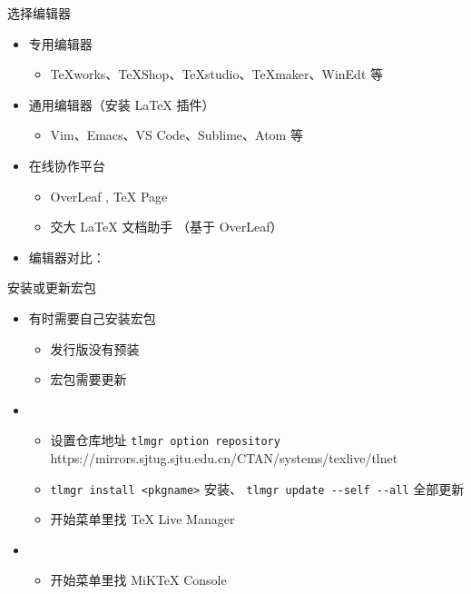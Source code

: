 \begin{frame}{选择编辑器}
  \begin{itemize}
    \item 专用编辑器
          \begin{itemize}
            \item TeXworks、TeXShop、\alert{TeXstudio}、TeXmaker、WinEdt 等
          \end{itemize}
    \item 通用编辑器（安装 \LaTeX{} 插件）
          \begin{itemize}
            \item Vim、Emacs、\alert{VS Code}、Sublime、Atom 等
          \end{itemize}
    \item 在线协作平台
          \begin{itemize}
            \item OverLeaf , 
                  \TeX{} Page 
            \item 交大 LaTeX 文档助手 （基于 OverLeaf）
          \end{itemize}
    \item 编辑器对比：
  \end{itemize}
\end{frame}

\begin{frame}[fragile]{安装或更新宏包}
  \begin{itemize}
    \item 有时需要自己安装宏包
          \begin{itemize}
            \item 发行版没有预装
            \item 宏包需要更新
          \end{itemize}
    \item \TL
          \begin{itemize}
            \item 设置仓库地址 \verb|tlmgr option repository| {\footnotesize\ttfamily
                  https://mirrors.sjtug.sjtu.edu.cn/CTAN/systems/texlive/tlnet}
            \item \verb|tlmgr install <pkgname>| 安装、 \verb|tlmgr update --self --all| 全部更新
            \item \faWindows{} 开始菜单里找 TeX Live Manager
          \end{itemize}
    \item \MiKTeX
          \begin{itemize}
            \item \faWindows{} 开始菜单里找 MiKTeX Console
          \end{itemize}
  \end{itemize}
\end{frame}
